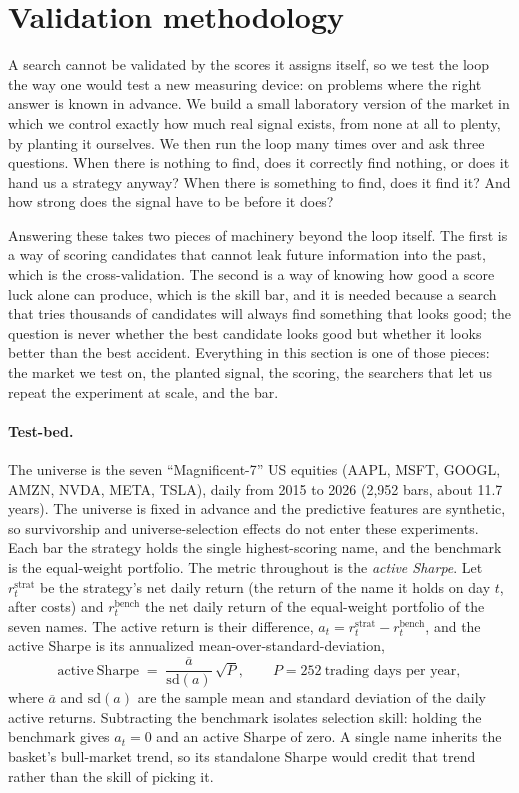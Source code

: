 \documentclass[11pt]{article}
\begin{document}
\section{Validation methodology}
\label{sec:method}

A search cannot be validated by the scores it assigns itself, so we test the
loop the way one would test a new measuring device: on problems where the right answer is known in
advance. We build a small laboratory version of the market in which we control exactly how much real
signal exists, from none at all to plenty, by planting it ourselves. We then run the loop many times over
and ask three questions. When there is nothing to find, does it correctly find nothing, or does it hand
us a strategy anyway? When there is something to find, does it find it? And how strong does the signal
have to be before it does?

Answering these takes two pieces of machinery beyond the loop itself. The first is a way of scoring
candidates that cannot leak future information into the past, which is the cross-validation. The second
is a way of knowing how good a score luck alone can produce, which is the skill bar, and it is needed
because a search that tries thousands of candidates will always find something that looks good; the
question is never whether the best candidate looks good but whether it looks better than the best
accident. Everything in this section is one of those pieces: the market we test on, the planted signal,
the scoring, the searchers that let us repeat the experiment at scale, and the bar.

\paragraph{Test-bed.} The universe is the seven ``Magnificent-7'' US equities (AAPL, MSFT, GOOGL,
AMZN, NVDA, META, TSLA), daily from 2015 to 2026 (2{,}952 bars, about 11.7 years). The universe is
fixed in advance and the predictive features are synthetic, so survivorship and universe-selection
effects do not enter these experiments. Each bar the strategy holds the single highest-scoring name,
and the benchmark is the equal-weight portfolio. The
metric throughout is the \emph{active Sharpe}. Let $r^{\mathrm{strat}}_t$ be the strategy's net daily
return (the return of the name it holds on day $t$, after costs) and $r^{\mathrm{bench}}_t$ the net daily
return of the equal-weight portfolio of the seven names. The active return is their difference,
$a_t = r^{\mathrm{strat}}_t - r^{\mathrm{bench}}_t$, and the active Sharpe is its annualized
mean-over-standard-deviation,
\begin{equation}
\mathrm{active\ Sharpe} \;=\; \frac{\overline{a}}{\mathrm{sd}(a)}\,\sqrt{P},
\qquad P = 252\ \text{trading days per year},
\label{eq:activesharpe}
\end{equation}
where $\overline{a}$ and $\mathrm{sd}(a)$ are the sample mean and standard deviation of the daily active
returns. Subtracting the benchmark isolates selection skill: holding the benchmark gives $a_t=0$ and an
active Sharpe of zero. A single name inherits the basket's bull-market trend, so its standalone Sharpe
would credit that trend rather than the skill of picking it.
\end{document}
